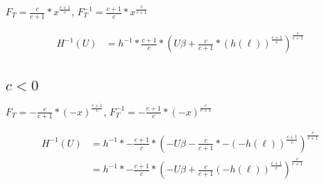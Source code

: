 $F_T = \frac{c}{c + 1} * x^{\frac{c + 1}{c}}$,
$F_T^{-1} = \frac{c + 1}{c} * x^{\frac{c}{c + 1}}$


\begin{align*}
H^{-1}(U) &= h^{-1} * \frac{c + 1}{c} * \left( U\beta + \frac{c}{c + 1} * (h(\ell))^{\frac{c + 1}{c}} \right)^{\frac{c}{c + 1}} \\
\end{align*}

\subsection{$c < 0$}

$F_T = - \frac{c}{c + 1} * (-x)^{\frac{c + 1}{c}}$,
$F_T^{-1} = - \frac{c + 1}{c} * (-x)^{\frac{c}{c + 1}}$


\begin{align*}
H^{-1}(U) &= h^{-1} * - \frac{c + 1}{c} * \left(- U\beta - \frac{c}{c + 1} * - (-h(\ell))^{\frac{c + 1}{c}} \right)^{\frac{c}{c + 1}} \\
&= h^{-1} * - \frac{c + 1}{c} * \left(- U\beta + \frac{c}{c + 1} (-h(\ell))^{\frac{c + 1}{c}} \right)^{\frac{c}{c + 1}} \\
\end{align*}


